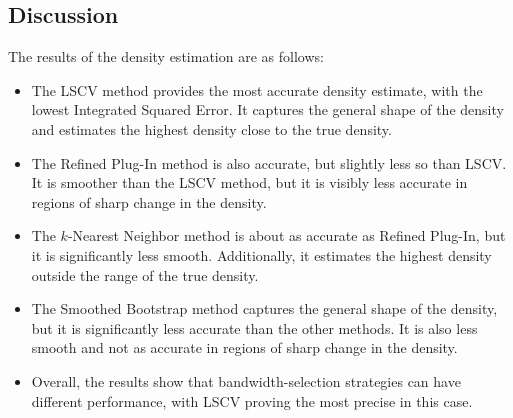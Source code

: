 \documentclass{article}
\begin{document}
\subsection{Discussion}

The results of the density estimation are as follows:

\begin{itemize}
  \item The LSCV method provides the most accurate density estimate, with the lowest Integrated Squared Error. It captures the general shape of the density and estimates the highest density close to the true density.
  \item The Refined Plug-In method is also accurate, but slightly less so than LSCV. It is smoother than the LSCV method, but it is visibly less accurate in regions of sharp change in the density.
  \item The \(k\)-Nearest Neighbor method is about as accurate as Refined Plug-In, but it is significantly less smooth. Additionally, it estimates the highest density outside the range of the true density.
  \item The Smoothed Bootstrap method captures the general shape of the density, but it is significantly less accurate than the other methods. It is also less smooth and not as accurate in regions of sharp change in the density.
  \item Overall, the results show that bandwidth-selection strategies can have different performance, with LSCV proving the most precise in this case.
\end{itemize}
\end{document}
